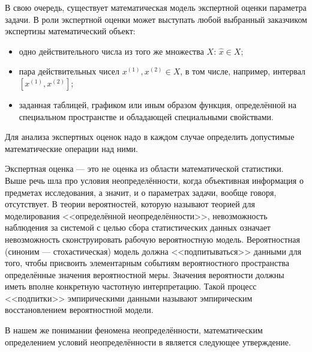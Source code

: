 В свою очередь, существует математическая модель экспертной оценки параметра задачи. %
В роли экспертной оценки может выступать любой выбранный заказчиком экспертизы математический объект: 
\begin{itemize}
  \item одно действительного числа из того же множества $X$: $\hat{x} \in X$;
  \item пара действительных чисел $x^{(1)}, x^{(2)} \in X$, в том числе, например, интервал $[x^{(1)}, x^{(2)}]$;
  \item заданная таблицей, графиком или иным образом функция, определённой на специальном пространстве и обладающей специальными свойствами.
\end{itemize}
Для анализа экспертных оценок надо в каждом случае определить допустимые математические операции над ними.

Экспертная оценка --- это не оценка из области математической статистики. Выше речь шла про условия неопределённости, когда объективная информация о предметах исследования, а значит, и о параметрах задачи, вообще говоря, отсутствует. В теории вероятностей, которую называют теорией для моделирования <<определённой неопределённости>>, невозможность наблюдения за системой с целью сбора статистических данных означает невозможность сконструировать рабочую вероятностную модель. Вероятностная (синоним --- стохастическая) модель должна <<подпитываться>> данными для того, чтобы присвоить элементарным событиям вероятностного пространства определённые значения вероятностной меры. Значения вероятности должны иметь вполне конкретную частотную интерпретацию. Такой процесс <<подпитки>> эмпирическими данными называют эмпирическим восстановлением вероятностной модели.

В нашем же понимании феномена неопределённости, математическим определением условий неопределённости в  является следующее утверждение. 
\begin{center}  \end{center} 

